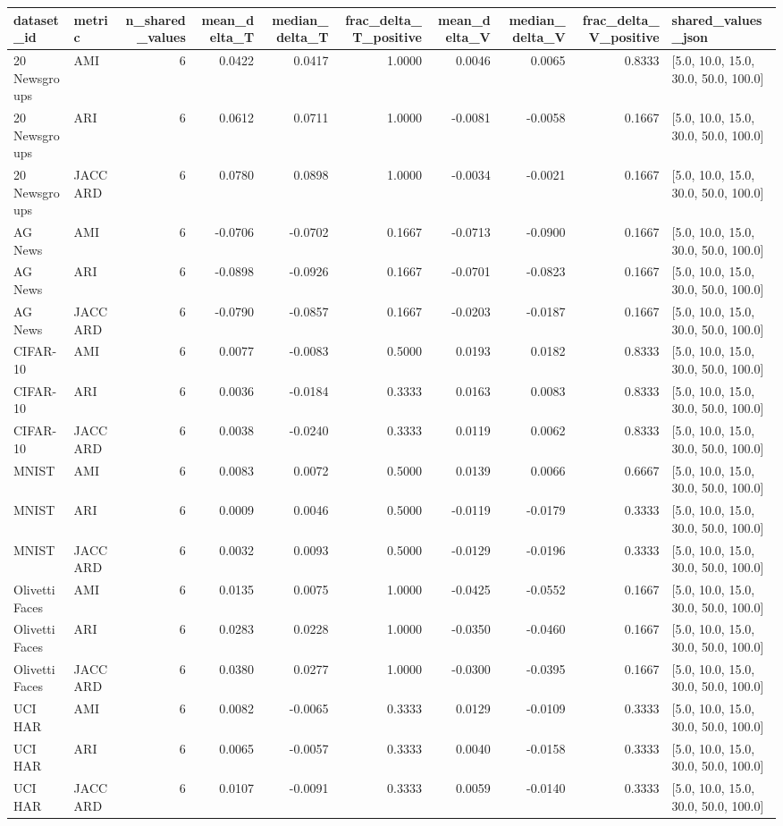 \begin{tabular}{llrrrrrrrl}
\toprule
dataset_id & metric & n_shared_values & mean_delta_T & median_delta_T & frac_delta_T_positive & mean_delta_V & median_delta_V & frac_delta_V_positive & shared_values_json \\
\midrule
20 Newsgroups & AMI & 6 & 0.0422 & 0.0417 & 1.0000 & 0.0046 & 0.0065 & 0.8333 & [5.0, 10.0, 15.0, 30.0, 50.0, 100.0] \\
20 Newsgroups & ARI & 6 & 0.0612 & 0.0711 & 1.0000 & -0.0081 & -0.0058 & 0.1667 & [5.0, 10.0, 15.0, 30.0, 50.0, 100.0] \\
20 Newsgroups & JACCARD & 6 & 0.0780 & 0.0898 & 1.0000 & -0.0034 & -0.0021 & 0.1667 & [5.0, 10.0, 15.0, 30.0, 50.0, 100.0] \\
AG News & AMI & 6 & -0.0706 & -0.0702 & 0.1667 & -0.0713 & -0.0900 & 0.1667 & [5.0, 10.0, 15.0, 30.0, 50.0, 100.0] \\
AG News & ARI & 6 & -0.0898 & -0.0926 & 0.1667 & -0.0701 & -0.0823 & 0.1667 & [5.0, 10.0, 15.0, 30.0, 50.0, 100.0] \\
AG News & JACCARD & 6 & -0.0790 & -0.0857 & 0.1667 & -0.0203 & -0.0187 & 0.1667 & [5.0, 10.0, 15.0, 30.0, 50.0, 100.0] \\
CIFAR-10 & AMI & 6 & 0.0077 & -0.0083 & 0.5000 & 0.0193 & 0.0182 & 0.8333 & [5.0, 10.0, 15.0, 30.0, 50.0, 100.0] \\
CIFAR-10 & ARI & 6 & 0.0036 & -0.0184 & 0.3333 & 0.0163 & 0.0083 & 0.8333 & [5.0, 10.0, 15.0, 30.0, 50.0, 100.0] \\
CIFAR-10 & JACCARD & 6 & 0.0038 & -0.0240 & 0.3333 & 0.0119 & 0.0062 & 0.8333 & [5.0, 10.0, 15.0, 30.0, 50.0, 100.0] \\
MNIST & AMI & 6 & 0.0083 & 0.0072 & 0.5000 & 0.0139 & 0.0066 & 0.6667 & [5.0, 10.0, 15.0, 30.0, 50.0, 100.0] \\
MNIST & ARI & 6 & 0.0009 & 0.0046 & 0.5000 & -0.0119 & -0.0179 & 0.3333 & [5.0, 10.0, 15.0, 30.0, 50.0, 100.0] \\
MNIST & JACCARD & 6 & 0.0032 & 0.0093 & 0.5000 & -0.0129 & -0.0196 & 0.3333 & [5.0, 10.0, 15.0, 30.0, 50.0, 100.0] \\
Olivetti Faces & AMI & 6 & 0.0135 & 0.0075 & 1.0000 & -0.0425 & -0.0552 & 0.1667 & [5.0, 10.0, 15.0, 30.0, 50.0, 100.0] \\
Olivetti Faces & ARI & 6 & 0.0283 & 0.0228 & 1.0000 & -0.0350 & -0.0460 & 0.1667 & [5.0, 10.0, 15.0, 30.0, 50.0, 100.0] \\
Olivetti Faces & JACCARD & 6 & 0.0380 & 0.0277 & 1.0000 & -0.0300 & -0.0395 & 0.1667 & [5.0, 10.0, 15.0, 30.0, 50.0, 100.0] \\
UCI HAR & AMI & 6 & 0.0082 & -0.0065 & 0.3333 & 0.0129 & -0.0109 & 0.3333 & [5.0, 10.0, 15.0, 30.0, 50.0, 100.0] \\
UCI HAR & ARI & 6 & 0.0065 & -0.0057 & 0.3333 & 0.0040 & -0.0158 & 0.3333 & [5.0, 10.0, 15.0, 30.0, 50.0, 100.0] \\
UCI HAR & JACCARD & 6 & 0.0107 & -0.0091 & 0.3333 & 0.0059 & -0.0140 & 0.3333 & [5.0, 10.0, 15.0, 30.0, 50.0, 100.0] \\
\bottomrule
\end{tabular}
